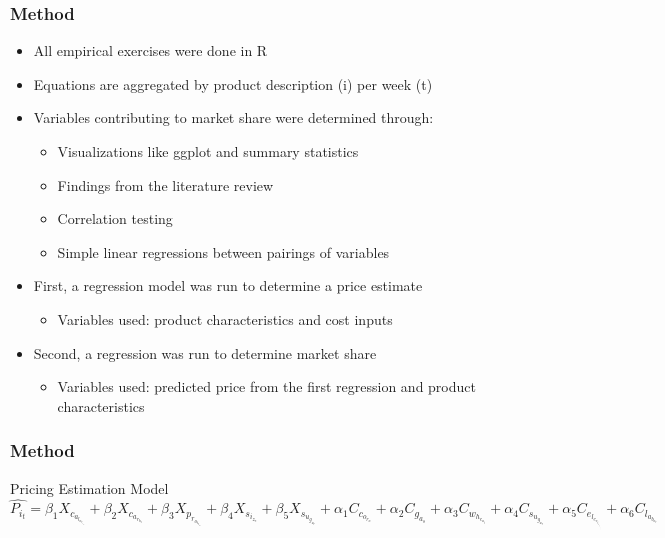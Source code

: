 \documentclass{beamer}
\begin{document}
\begin{frame}
\frametitle{Method}

\begin{itemize}
  \item All empirical exercises were done in R
  \item Equations are aggregated by product description (i) per week (t) 
  \item Variables contributing to market share were determined through:
    \begin{itemize}
    \item Visualizations like ggplot and summary statistics
    \item Findings from the literature review
    \item Correlation testing
    \item Simple linear regressions between pairings of variables
    \end{itemize}
 \item First, a regression model was run to determine a price estimate
 \begin{itemize}
    \item Variables used: product characteristics and cost inputs
    \end{itemize}
\item Second, a regression was run to determine market share 
 \begin{itemize}
    \item Variables used: predicted price from the first regression and product characteristics
    \end{itemize}
\end{itemize}
\end{frame}

\begin{frame}
\frametitle{Method}
Pricing Estimation Model
\begin{displaymath} 

\widehat{P_i_t}= \beta_1X_c_a_l_o_r_i_e_s + \beta_2X_c_a_r_b_s + \beta_3X_p_r_o_t_e_i_n +
\beta_4X_s_i_z_e + \beta_5X_s_u_g_a_r + \alpha_1C_c_o_r_n + \alpha_2C_g_a_s + \alpha_3C_w_h_e_a_t + \alpha_4C_s_u_g_a_r + \alpha_5C_e_l_e_c_t_r_i_c_i_t_y + \alpha_6C_l_a_b_o_r

\end{displaymath}

\end{frame}
\end{document}
